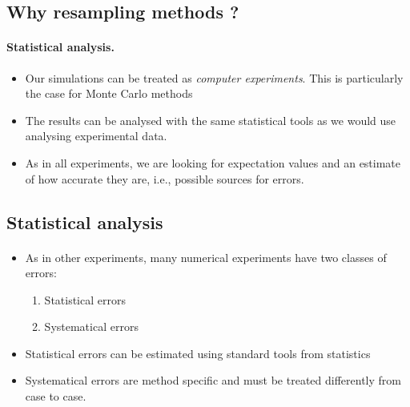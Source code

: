 \documentclass[%
oneside,                 %
final,                   %
10pt]{article}
\begin{document}
\noindent



\subsection*{Why resampling methods ?}

\paragraph{Statistical analysis.}
\begin{itemize}
\item Our simulations can be treated as \emph{computer experiments}. This is particularly the case for Monte Carlo methods

\item The results can be analysed with the same statistical tools as we would use analysing experimental data.

\item As in all experiments, we are looking for expectation values and an estimate of how accurate they are, i.e., possible sources for errors.
\end{itemize}

\noindent

    

\subsection*{Statistical analysis}

\paragraph{}
\begin{itemize}
\item As in other experiments, many numerical  experiments have two classes of errors:
\begin{enumerate}

\item Statistical errors

\item Systematical errors

\end{enumerate}

\noindent
\item Statistical errors can be estimated using standard tools from statistics

\item Systematical errors are method specific and must be treated differently from case to case. 
\end{itemize}
\end{document}
